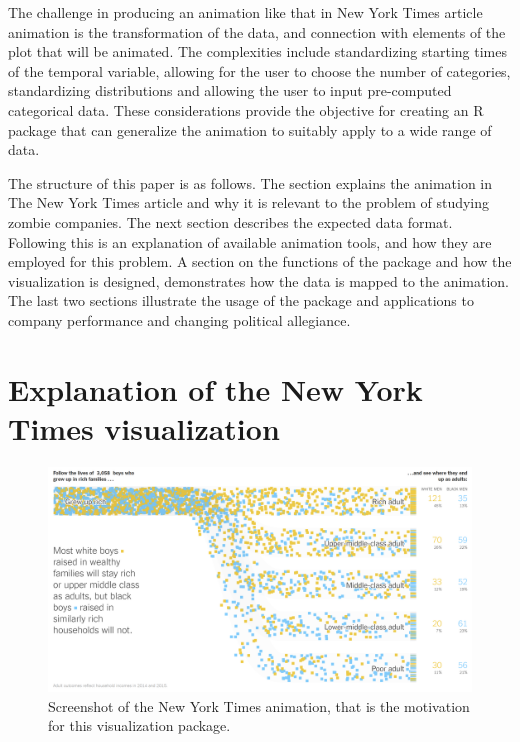 The challenge in producing an animation like that in New York Times article animation is the transformation of the data, and connection with elements of the plot that will be animated. The complexities include standardizing starting times of the temporal variable, allowing for the user to choose the number of categories, standardizing distributions and allowing the user to input pre-computed categorical data. These considerations provide the objective for creating an R package that can generalize the animation to suitably apply to a wide range of data.

The structure of this paper is as follows. The section explains the animation in The New York Times article and why it is relevant to the problem of studying zombie companies. The next section describes the expected data format. Following this is an explanation of available animation tools, and how they are employed for this problem. A section on the functions of the package and how the visualization is designed, demonstrates how the data is mapped to the animation. The last two sections illustrate the usage of the package and applications to company performance and changing political allegiance.

\hypertarget{NYT}{%
\section{Explanation of the New York Times visualization}\label{NYT}}

\begin{figure}

{\centering \includegraphics[width=1\linewidth]{figures/NYT} 

}

\caption{Screenshot of the New York Times animation, that is the motivation for this visualization package.}\label{fig:nyt}
\end{figure}

